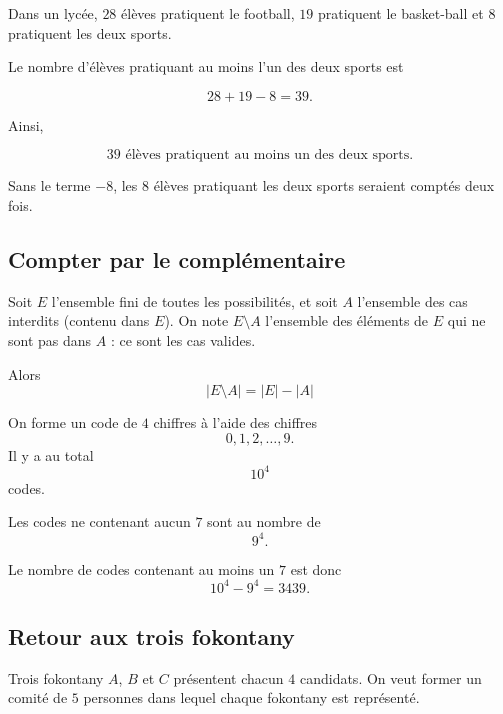 \documentclass[11pt]{article}
\begin{document}
\begin{exemple}
Dans un lycée, \(28\) élèves pratiquent le football, \(19\) pratiquent le
basket-ball et \(8\) pratiquent les deux sports.
\end{exemple}

\begin{solution}
Le nombre d'élèves pratiquant au moins l'un des deux sports est

\[
28+19-8=39.
\]

Ainsi,

\[
\boxed{39\text{ élèves pratiquent au moins un des deux sports}.}
\]

Sans le terme \(-8\), les \(8\) élèves pratiquant les deux sports seraient
comptés deux fois.
\end{solution}

\subsection{Compter par le complémentaire}\label{sec:complementaire}

\begin{proposition}\label{prop:complementaire}
Soit \(E\) l'ensemble fini de toutes les possibilités, et soit \(A\) l'ensemble des
cas interdits (contenu dans \(E\)). On note \(E\setminus A\) l'ensemble des éléments de \(E\)
qui ne sont pas dans \(A\) : ce sont les cas valides.

Alors
\[
\boxed{
|E\setminus A|
=
|E|-|A|
}
\]
\end{proposition}

\begin{exemple}
On forme un code de \(4\) chiffres à l'aide des chiffres
\[
0,1,2,\dots,9.
\]
Il y a au total
\[
10^4
\]
codes.

Les codes ne contenant aucun \(7\) sont au nombre de
\[
9^4.
\]

Le nombre de codes contenant au moins un \(7\) est donc
\[
\boxed{10^4-9^4=3439.}
\]
\end{exemple}

\subsection{Retour aux trois fokontany}\label{sec:retour-trois-fokontany}

\begin{exemple}
Trois fokontany \(A\), \(B\) et \(C\) présentent chacun \(4\) candidats.
On veut former un comité de \(5\) personnes dans lequel chaque fokontany est
représenté.
\end{exemple}
\end{document}
